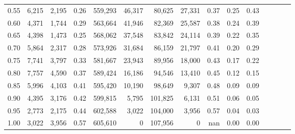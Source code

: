 \begin{tabular}{rrrcrrrrrrrrrrr}
0.55 &    6,215 &   2,195 &                                       0.26 &  559,293 &   46,317 &   80,625 &   27,331 &  0.37 &  0.25 &                         0.43 \\
0.60 &    4,371 &   1,744 &                                       0.29 &  563,664 &   41,946 &   82,369 &   25,587 &  0.38 &  0.24 &                         0.39 \\
0.65 &    4,398 &   1,473 &                                       0.25 &  568,062 &   37,548 &   83,842 &   24,114 &  0.39 &  0.22 &                         0.35 \\
0.70 &    5,864 &   2,317 &                                       0.28 &  573,926 &   31,684 &   86,159 &   21,797 &  0.41 &  0.20 &                         0.29 \\
0.75 &    7,741 &   3,797 &                                       0.33 &  581,667 &   23,943 &   89,956 &   18,000 &  0.43 &  0.17 &                         0.22 \\
0.80 &    7,757 &   4,590 &                                       0.37 &  589,424 &   16,186 &   94,546 &   13,410 &  0.45 &  0.12 &                         0.15 \\
0.85 &    5,996 &   4,103 &                                       0.41 &  595,420 &   10,190 &   98,649 &    9,307 &  0.48 &  0.09 &                         0.09 \\
0.90 &    4,395 &   3,176 &                                       0.42 &  599,815 &    5,795 &  101,825 &    6,131 &  0.51 &  0.06 &                         0.05 \\
0.95 &    2,773 &   2,175 &                                       0.44 &  602,588 &    3,022 &  104,000 &    3,956 &  0.57 &  0.04 &                         0.03 \\
1.00 &    3,022 &   3,956 &                                       0.57 &  605,610 &        0 &  107,956 &        0 &   nan &  0.00 &                         0.00 \\
\bottomrule
\end{tabular}
